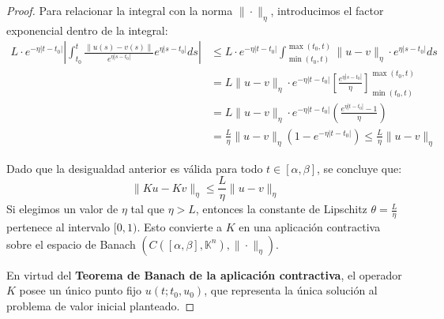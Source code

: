 \begin{proof}
    Para relacionar la integral con la norma $\|\cdot\|_\eta$, introducimos el factor exponencial dentro de la integral:
    \begin{align*}
    L \cdot e^{-\eta |t - t_0|} \left| \int_{t_0}^t \frac{\|u(s) - v(s)\|}{e^{\eta |s - t_0|}} e^{\eta |s - t_0|} ds \right| &\le L \cdot e^{-\eta |t - t_0|} \int_{\min(t_0, t)}^{\max(t_0, t)} \|u - v\|_\eta \cdot e^{\eta |s - t_0|} ds \\
    &= L \|u - v\|_\eta \cdot e^{-\eta |t - t_0|} \left[ \frac{e^{\eta |s - t_0|}}{\eta} \right]_{\min(t_0, t)}^{\max(t_0, t)} \\
    &= L \|u - v\|_\eta \cdot e^{-\eta |t - t_0|} \left( \frac{e^{\eta |t - t_0|} - 1}{\eta} \right) \\
    &= \frac{L}{\eta} \|u - v\|_\eta (1 - e^{-\eta |t - t_0|}) \le \frac{L}{\eta} \|u - v\|_\eta
    \end{align*}
    
    Dado que la desigualdad anterior es válida para todo $t \in [\alpha, \beta]$, se concluye que:
    \[
    \|Ku - Kv\|_\eta \le \frac{L}{\eta} \|u - v\|_\eta
    \]
    Si elegimos un valor de $\eta$ tal que $\eta > L$, entonces la constante de Lipschitz $\theta = \frac{L}{\eta}$ pertenece al intervalo $[0, 1)$. Esto convierte a $K$ en una aplicación contractiva sobre el espacio de Banach $(C([\alpha, \beta], \mathbb{K}^n), \|\cdot\|_\eta)$. 
    
    En virtud del \textbf{Teorema de Banach de la aplicación contractiva}, el operador $K$ posee un único punto fijo $u(t; t_0, u_0)$, que representa la única solución al problema de valor inicial planteado.
\end{proof}

